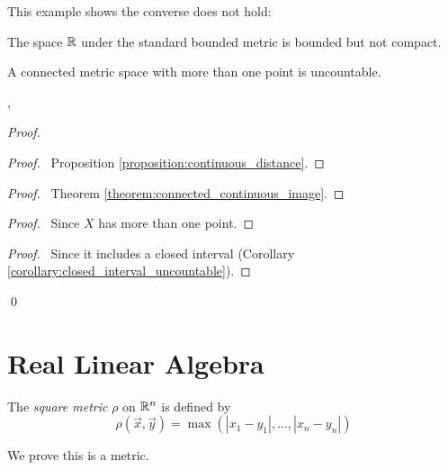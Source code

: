 This example shows the converse does not hold:

\begin{example}
    The space $\mathbb{R}$ under the standard bounded metric is bounded but not compact.
\end{example}

\begin{proposition}
    A connected metric space with more than one point is uncountable.
\end{proposition}
,
\begin{proof}
    \pf
    \begin{proof}
        \pf\ Proposition \ref{proposition:continuous_distance}.
    \end{proof}
    \begin{proof}
        \pf\ Theorem \ref{theorem:connected_continuous_image}.
    \end{proof}
    \begin{proof}
        \pf\ Since $X$ has more than one point.
    \end{proof}
    \begin{proof}
        \pf\ Since it includes a closed interval (Corollary \ref{corollary:closed_interval_uncountable}).
    \end{proof}
    \qed
\end{proof}

\section{Real Linear Algebra}

\begin{definition}
    The \emph{square metric} $\rho$ on $\mathbb{R}^n$ is defined by
    \[ \rho(\vec{x}, \vec{y}) = \max(|x_1 - y_1|, \ldots, |x_n - y_n|) \]
\end{definition}

We prove this is a metric.

